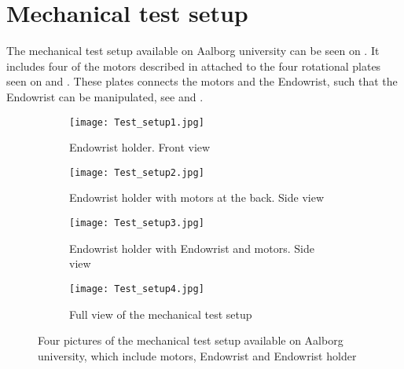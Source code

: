 \section{Mechanical test setup}\label{sec:Mechanical_testsetup.tex}
The mechanical test setup available on Aalborg university can be seen on . It includes four of the motors described in  attached to the four rotational plates seen on  and . These plates connects the motors and the Endowrist, such that the Endowrist can be manipulated, see  and .  

\begin{figure}[H]
	\centering
	\begin{minipage}[t]{0.9\textwidth}
	\begin{subfigure}{0.45\textwidth}
		\vspace{-10pt}
		\centering
		\texttt{[image: Test\_setup1.jpg]}
		\caption{Endowrist holder. Front view}
		\label{fig:Mec_a}
	\end{subfigure}
	\hspace{\fill}
	\begin{subfigure}{0.45\textwidth}
		\centering
		\texttt{[image: Test\_setup2.jpg]}
		\caption{Endowrist holder with motors at the back. Side view}
		\label{fig:Mec_b}
	\end{subfigure}
	\end{minipage}

	\begin{minipage}[t]{0.9\textwidth}
	\vspace{20pt}
	\begin{subfigure}{0.45\textwidth}
		\vspace{0pt}
		\centering
		\texttt{[image: Test\_setup3.jpg]}
		\caption{Endowrist holder with Endowrist and motors. Side view}
		\label{fig:Mec_c}
	\end{subfigure}
	\hspace{\fill}
	\begin{subfigure}{0.45\textwidth}
		\centering
		\texttt{[image: Test\_setup4.jpg]}
		\caption{Full view of the mechanical test setup}
		\label{fig:Mec_d}
	\end{subfigure}
	\end{minipage}

	\caption{Four pictures of the mechanical test setup available on Aalborg university, which include motors, Endowrist and Endowrist holder}
	\label{fig:Mec_abcd}
\end{figure}